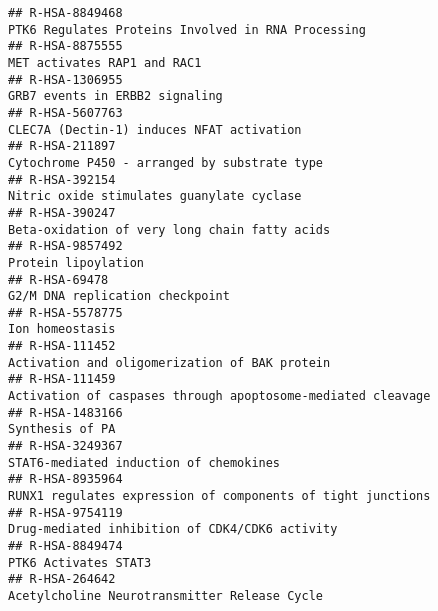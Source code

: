 \documentclass[
]{article}
\begin{document}
\begin{verbatim}
## R-HSA-8849468                                                                                   PTK6 Regulates Proteins Involved in RNA Processing
## R-HSA-8875555                                                                                                          MET activates RAP1 and RAC1
## R-HSA-1306955                                                                                                       GRB7 events in ERBB2 signaling
## R-HSA-5607763                                                                                            CLEC7A (Dectin-1) induces NFAT activation
## R-HSA-211897                                                                                          Cytochrome P450 - arranged by substrate type
## R-HSA-392154                                                                                             Nitric oxide stimulates guanylate cyclase
## R-HSA-390247                                                                                         Beta-oxidation of very long chain fatty acids
## R-HSA-9857492                                                                                                                  Protein lipoylation
## R-HSA-69478                                                                                                        G2/M DNA replication checkpoint
## R-HSA-5578775                                                                                                                      Ion homeostasis
## R-HSA-111452                                                                                         Activation and oligomerization of BAK protein
## R-HSA-111459                                                                           Activation of caspases through apoptosome-mediated cleavage
## R-HSA-1483166                                                                                                                      Synthesis of PA
## R-HSA-3249367                                                                                               STAT6-mediated induction of chemokines
## R-HSA-8935964                                                                          RUNX1 regulates expression of components of tight junctions
## R-HSA-9754119                                                                                       Drug-mediated inhibition of CDK4/CDK6 activity
## R-HSA-8849474                                                                                                                 PTK6 Activates STAT3
## R-HSA-264642                                                                                          Acetylcholine Neurotransmitter Release Cycle

\end{verbatim}
\end{document}
